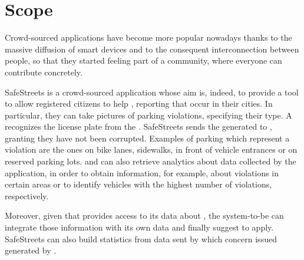 \documentclass[../../DD.tex]{subfiles}
\begin{document}
\section{Scope\label{sect:1.2}}
	
Crowd-sourced applications have become more popular nowadays thanks to the massive diffusion of smart devices and to the consequent interconnection between people, so that they started feeling part of a community, where everyone can contribute concretely.\newline

SafeStreets is a crowd-sourced application whose aim is, indeed, to provide a tool to allow registered citizens to help , reporting  that occur in their cities. In particular, they can take pictures of parking violations, specifying their type. A  recognizes the license plate from the . SafeStreets sends the generated  to , granting they have not been corrupted. Examples of parking which represent a violation are the ones on bike lanes, sidewalks, in front of vehicle entrances or on reserved parking lots.\newline
{} and  can also retrieve analytics about data collected by the application, in order to obtain  information, for example, about violations in certain areas or to identify vehicles with the highest number of violations, respectively.\newline

Moreover, given that  provides access to its data about , the system-to-be can integrate those information with its own data and finally suggest   to apply.\newline
SafeStreets can also build statistics from data sent by  which concern issued  generated by .
\end{document}
